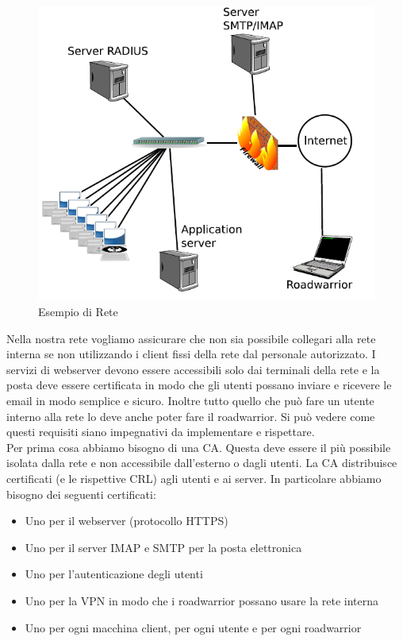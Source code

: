 \begin{figure}[h]
	\centering
	\includegraphics[scale = 0.4]{images/network_example1.png}
	\caption{Esempio di Rete}
	\label{img:network_example1}
\end{figure}

Nella nostra rete vogliamo assicurare che non sia possibile collegari alla rete interna se non utilizzando i client fissi della rete dal personale autorizzato. I servizi di webserver devono essere accessibili solo dai terminali della rete e la posta deve essere certificata in modo che gli utenti possano inviare e ricevere le email in modo semplice e sicuro. Inoltre tutto quello che può fare un utente interno alla rete lo deve anche poter fare il roadwarrior. Si può vedere come questi requisiti siano impegnativi da implementare e rispettare. \\

Per prima cosa abbiamo bisogno di una CA. Questa deve essere il più possibile isolata dalla rete e non accessibile dall'esterno o dagli utenti. La CA distribuisce certificati (e le rispettive CRL) agli utenti e ai server.  In particolare abbiamo bisogno dei seguenti certificati:
\begin{itemize}
\item Uno per il webserver (protocollo HTTPS)
\item Uno per il server IMAP e SMTP per la posta elettronica
\item Uno per l'autenticazione degli utenti
\item Uno per la VPN in modo che i roadwarrior possano usare la rete interna
\item Uno per ogni macchina client, per ogni utente e per ogni roadwarrior
\end{itemize}

